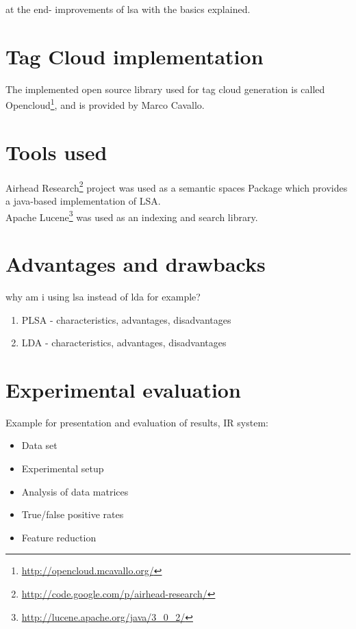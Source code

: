 at the end- improvements of lsa with the basics explained.\\

\section{Tag Cloud implementation}
\label{sec:implementation:tag_cloud}
The implemented open source library used for tag cloud generation is called Opencloud\footnote{\url{http://opencloud.mcavallo.org/}}, and is provided by Marco Cavallo.\\

\section{Tools used}
\label{sec:implementation:tools_used}
Airhead Research\footnote{\url{http://code.google.com/p/airhead-research/}} project was used as a semantic spaces Package which provides a java-based implementation of \gls{LSA}.\\

Apache Lucene\footnote{\url{http://lucene.apache.org/java/3_0_2/}} was used as an indexing and search library.

\section{Advantages and drawbacks}
\label{sec:lsa:adv_disadv}

why am i using lsa instead of lda for example?\\

\begin{enumerate}
\item PLSA - characteristics, advantages, disadvantages
\item LDA - characteristics, advantages, disadvantages
\end{enumerate}



\section{Experimental evaluation}
Example for presentation and evaluation of results, IR system:~\cite{SpamFilteringLSI2008} \\
\begin{itemize}
\item Data set
\item Experimental setup
\item Analysis of data matrices
\item True/false positive rates
\item Feature reduction
\end{itemize}
